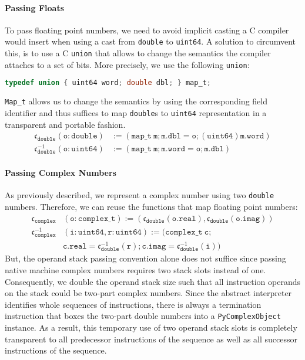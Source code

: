 \documentclass[preprint,10pt]{popl14conf}
\begin{document}
\paragraph{Passing Floats}
To pass floating point numbers, we need to avoid implicit casting a C compiler would insert when
using a cast from \texttt{double} to \texttt{uint64}.
A solution to circumvent this, is to use a C \texttt{union} that allows to change the semantics the
compiler attaches to a set of bits.
More precisely, we use the following \texttt{union}:
\begin{lstlisting}[language=C, morekeywords={uint64,int64},style=othercode]
typedef union { uint64 word; double dbl; } map_t;
\end{lstlisting}
\texttt{Map_t} allows us to change the semantics by using the corresponding field identifier and
thus suffices to map \texttt{double}s to \texttt{uint64} representation in a transparent and
portable fashion.
\begin{align*}
  \mathfrak{c}_{\mathtt{double}}(\mathtt{o}: \mathtt{double})     & := (\mathtt{map\_t~m};\mathtt{m.dbl}= \mathtt{o};(\mathtt{uint64})\mathtt{m.word}) \\
  \mathfrak{c}_{\mathtt{double}}^{-1}(\mathtt{o}: \mathtt{uint64}) & := (\mathtt{map\_t~m};\mathtt{m.word}= \mathtt{o}; \mathtt{m.dbl})
\end{align*}


\paragraph{Passing Complex Numbers}
As previously described, we represent a complex number using two \texttt{double} numbers.
Therefore, we can reuse the functions that map floating point numbers:
\begin{align*}
  \mathfrak{c}_{\mathtt{complex}}&(\mathtt{o}: \mathtt{complex\_t})     := (\mathfrak{c}_{\mathtt{double}}(\mathtt{o.real}), \mathfrak{c}_{\mathtt{double}}(\mathtt{o.imag}))\\
  \mathfrak{c}_{\mathtt{complex}}^{-1}&(\mathtt{i}: \mathtt{uint64}, \mathtt{r}: \mathtt{uint64}) :=
  (\mathtt{complex\_t~c}; \\
  & \mathtt{c.real}= \mathfrak{c}_{\mathtt{double}}^{-1}(\mathtt{r}); \mathtt{c.imag}= \mathfrak{c}_{\mathtt{double}}^{-1}(\mathtt{i}))
\end{align*}
But, the operand stack passing convention alone does not suffice since passing native machine
complex numbers requires two stack slots instead of one.
Consequently, we double the operand stack size such that all instruction operands on the stack could
be two-part complex numbers.
Since the abstract interpreter identifies whole sequences of instructions, there is always a
termination instruction that boxes the two-part double numbers into a \texttt{PyComplexObject}
instance.
As a result, this temporary use of two operand stack slots is completely transparent to  all
predecessor instructions of the sequence as well as all successor instructions of the sequence.
\end{document}
